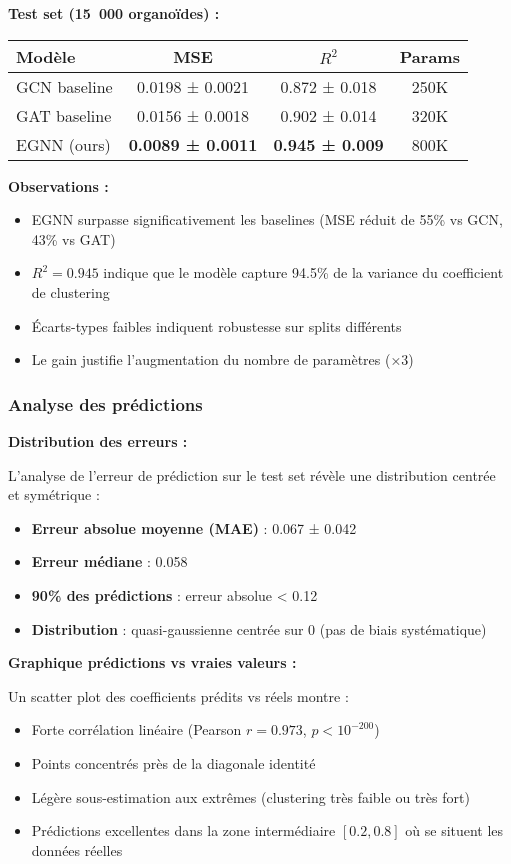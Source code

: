 \textbf{Test set (15~000 organoïdes) :}

\begin{center}
\begin{tabular}{|l|c|c|c|}
\hline
\textbf{Modèle} & \textbf{MSE} & \textbf{$R^2$} & \textbf{Params} \\
\hline
GCN baseline & 0.0198 ± 0.0021 & 0.872 ± 0.018 & 250K \\
GAT baseline & 0.0156 ± 0.0018 & 0.902 ± 0.014 & 320K \\
EGNN (ours) & \textbf{0.0089 ± 0.0011} & \textbf{0.945 ± 0.009} & 800K \\
\hline
\end{tabular}
\end{center}

\textbf{Observations :}
\begin{itemize}
    \item EGNN surpasse significativement les baselines (MSE réduit de 55\% vs GCN, 43\% vs GAT)
    \item $R^2 = 0.945$ indique que le modèle capture 94.5\% de la variance du coefficient de clustering
    \item Écarts-types faibles indiquent robustesse sur splits différents
    \item Le gain justifie l'augmentation du nombre de paramètres (×3)
\end{itemize}

\subsubsection{Analyse des prédictions}

\textbf{Distribution des erreurs :}

L'analyse de l'erreur de prédiction sur le test set révèle une distribution centrée et symétrique :
\begin{itemize}
    \item \textbf{Erreur absolue moyenne (MAE)} : 0.067 ± 0.042
    \item \textbf{Erreur médiane} : 0.058
    \item \textbf{90\% des prédictions} : erreur absolue < 0.12
    \item \textbf{Distribution} : quasi-gaussienne centrée sur 0 (pas de biais systématique)
\end{itemize}

\textbf{Graphique prédictions vs vraies valeurs :}

Un scatter plot des coefficients prédits vs réels montre :
\begin{itemize}
    \item Forte corrélation linéaire (Pearson $r = 0.973$, $p < 10^{-200}$)
    \item Points concentrés près de la diagonale identité
    \item Légère sous-estimation aux extrêmes (clustering très faible ou très fort)
    \item Prédictions excellentes dans la zone intermédiaire $[0.2, 0.8]$ où se situent les données réelles
\end{itemize}

